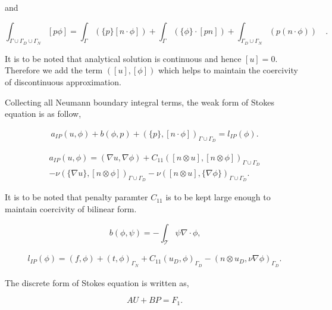 \documentclass[a4paper,twoside,openright]{book}
\begin{document}
and 

\begin{equation}
\int_{\Gamma \cup \Gamma_D \cup \Gamma_N} [p \phi] = \int_{\Gamma} (\lbrace p \rbrace [ n \cdot \phi]) + \int_{\Gamma} (\lbrace \phi \rbrace \cdot [pn]) + \int_{\Gamma_D \cup \Gamma_N} (p (n \cdot \phi) ) \quad \textrm{.}
\end{equation}

It is to be noted that analytical solution is continuous and hence $[u] = 0$. Therefore we add the term $([u],[\phi])$ which helps to maintain the coercivity of discontinuous approximation.


Collecting all Neumann boundary integral terms, the weak form of Stokes equation is as follow,

\begin{equation}\label{stokes_weak_ch3}
\begin{split}
a_{IP}(u,\phi) + b(\phi,p) + (\{p\},[n\cdot \phi])_{\Gamma \cup \Gamma_D} = l_{IP}(\phi) \textrm{.}
\end{split}
\end{equation}

\begin{equation}
\begin{split}
a_{IP}(u,\phi) = (\nabla u, \nabla \phi) + C_{11} ([n \otimes u],[n \otimes \phi])_{\Gamma \cup \Gamma_D} \\
- \nu (\{\nabla u\},[n \otimes \phi])_{\Gamma \cup \Gamma_D} - \nu ([n \otimes u],\{\nabla \phi\})_{\Gamma \cup \Gamma_D} \textrm{.}
\end{split}
\end{equation}

It is to be noted that penalty paramter $C_{11}$ is to be kept large enough to maintain coercivity of bilinear form.

\begin{equation}
b(\phi,\psi) = -\int_{\mathcal{T}} \psi \nabla \cdot \phi \textrm{,}
\end{equation}

\begin{equation}
\begin{split}
l_{IP}(\phi) = (f,\phi) + (t,\phi)_{\Gamma_N} + C_{11} (u_D,\phi)_{\Gamma_D} - (n \otimes u_D, \nu \nabla \phi)_{\Gamma_D} \textrm{.}
\end{split}
\end{equation}

The discrete form of Stokes equation is written as,

\begin{equation} \label{stokes discrete_ch3}
AU + BP = F_1 \textrm{.}
\end{equation}
\end{document}
